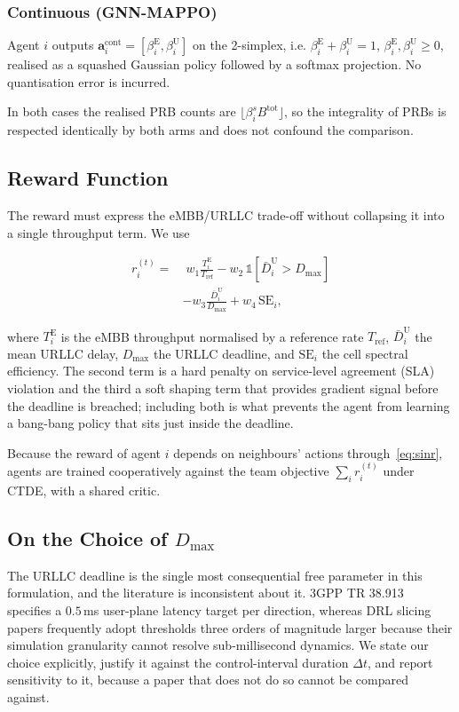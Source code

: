 \documentclass[journal]{IEEEtran}
\begin{document}
\subsubsection{Continuous (GNN-MAPPO)} Agent $i$ outputs
$\mathbf{a}_i^{\mathrm{cont}} = [\beta_i^{\mathrm{E}},
\beta_i^{\mathrm{U}}]$ on the 2-simplex, i.e.
$\beta_i^{\mathrm{E}} + \beta_i^{\mathrm{U}} = 1$,
$\beta_i^{\mathrm{E}},\beta_i^{\mathrm{U}} \geq 0$, realised as a
squashed Gaussian policy followed by a softmax projection. No
quantisation error is incurred.

In both cases the realised PRB counts are
$\lfloor \beta_i^{s} B^{\mathrm{tot}} \rfloor$, so the integrality of
PRBs is respected identically by both arms and does not confound the
comparison.

\subsection{Reward Function}
The reward must express the eMBB/URLLC trade-off without collapsing it
into a single throughput term. We use

\begin{align}
r_i^{(t)} = &\; w_1 \frac{T_i^{\mathrm{E}}}{T_{\mathrm{ref}}}
- w_2 \,\mathbb{1}\!\left[\bar{D}_i^{\mathrm{U}} > D_{\max}\right] \nonumber\\
&- w_3 \frac{\bar{D}_i^{\mathrm{U}}}{D_{\max}}
+ w_4 \, \mathrm{SE}_i,
\label{eq:reward}
\end{align}

where $T_i^{\mathrm{E}}$ is the eMBB throughput normalised by a
reference rate $T_{\mathrm{ref}}$, $\bar{D}_i^{\mathrm{U}}$ the mean
URLLC delay, $D_{\max}$ the URLLC deadline, and $\mathrm{SE}_i$ the
cell spectral efficiency. The second term is a hard penalty on
service-level agreement (SLA) violation and the third a soft shaping
term that provides gradient signal before the deadline is breached;
including both is what prevents the agent from learning a
bang-bang policy that sits just inside the deadline.

Because the reward of agent $i$ depends on neighbours' actions
through~\eqref{eq:sinr}, agents are trained cooperatively against the
team objective $\sum_i r_i^{(t)}$ under CTDE, with a shared critic.

\subsection{On the Choice of \texorpdfstring{$D_{\max}$}{Dmax}}
The URLLC deadline is the single most consequential free parameter in
this formulation, and the literature is inconsistent about it. 3GPP TR
38.913~\cite{3gpp38913} specifies a $0.5$\,ms user-plane latency target
per direction, whereas DRL slicing papers frequently adopt thresholds
three orders of magnitude larger because their simulation granularity
cannot resolve sub-millisecond dynamics. We state our choice
explicitly, justify it against the control-interval duration
$\Delta t$, and report sensitivity to it, because a paper that does not
do so cannot be compared against.
\end{document}
